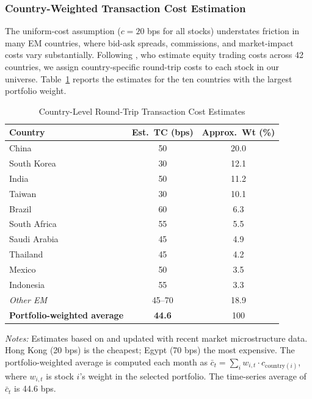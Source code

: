 \documentclass[12pt,a4paper]{article}
\begin{document}
\subsubsection{Country-Weighted Transaction Cost Estimation}

The uniform-cost assumption ($c = 20$ bps for all stocks) understates friction in many EM countries, where bid-ask spreads, commissions, and market-impact costs vary substantially. Following \citet{domowitz2001}, who estimate equity trading costs across 42 countries, we assign country-specific round-trip costs to each stock in our universe. Table~\ref{tab:country_tc} reports the estimates for the ten countries with the largest portfolio weight.

\begin{table}[H]
\centering
\caption{Country-Level Round-Trip Transaction Cost Estimates}
\label{tab:country_tc}
\small
\begin{tabular}{lcc}
\toprule
\textbf{Country} & \textbf{Est.\ TC (bps)} & \textbf{Approx.\ Wt (\%)} \\
\midrule
China         & 50 & 20.0 \\
South Korea   & 30 & 12.1 \\
India         & 50 & 11.2 \\
Taiwan        & 30 & 10.1 \\
Brazil        & 60 &  6.3 \\
South Africa  & 55 &  5.5 \\
Saudi Arabia  & 45 &  4.9 \\
Thailand      & 45 &  4.2 \\
Mexico        & 50 &  3.5 \\
Indonesia     & 55 &  3.3 \\
\midrule
\textit{Other EM}  & 45--70 & 18.9 \\
\midrule
\textbf{Portfolio-weighted average} & \textbf{44.6} & 100 \\
\bottomrule
\end{tabular}
\begin{minipage}{\textwidth}
\vspace{0.3em}
\footnotesize
\textit{Notes:} Estimates based on \citet{domowitz2001} and updated with recent market microstructure data. Hong Kong (20 bps) is the cheapest; Egypt (70 bps) the most expensive. The portfolio-weighted average is computed each month as $\bar{c}_t = \sum_i w_{i,t} \cdot c_{\text{country}(i)}$, where $w_{i,t}$ is stock $i$'s weight in the selected portfolio. The time-series average of $\bar{c}_t$ is 44.6 bps.
\end{minipage}
\end{table}
\end{document}
